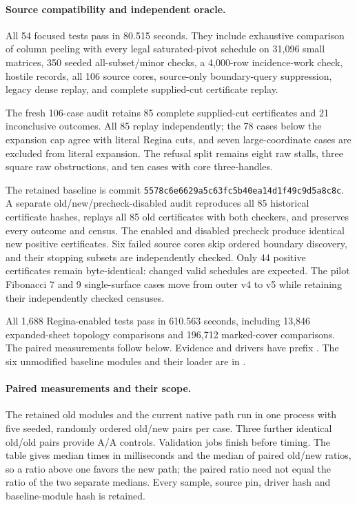 \paragraph{Source compatibility and independent oracle.}
All 54 focused tests pass in 80.515 seconds. They include exhaustive comparison
of column peeling with every legal saturated-pivot schedule on 31,096 small
matrices, 350 seeded all-subset/minor checks, a 4,000-row incidence-work check,
hostile records, all 106 source cores, source-only boundary-query suppression,
legacy dense replay, and complete supplied-cut certificate replay.

The fresh 106-case audit retains 85 complete supplied-cut certificates and
21 inconclusive outcomes. All 85 replay independently; the 78 cases below
the expansion cap agree with literal Regina cuts, and seven large-coordinate
cases are excluded from literal expansion. The refusal split remains eight
raw stalls, three square raw obstructions, and ten cases with core three-handles.

The retained baseline is commit \texttt{5578c6e6629a5c63fc5b40ea14d1f49c9d5a8c8c}.
A separate old/new/precheck-disabled audit reproduces all 85 historical
certificate hashes, replays all 85 old certificates with both checkers, and
preserves every outcome and census. The enabled and disabled precheck produce
identical new positive certificates. Six failed source cores skip ordered
boundary discovery, and their stopping subsets are independently checked.
Only 44 positive certificates remain byte-identical: changed valid schedules
are expected. The pilot Fibonacci 7 and 9 single-surface cases move from outer
v4 to v5 while retaining their independently checked censuses.

All 1,688 Regina-enabled tests pass in 610.563 seconds, including 13,846
expanded-sheet topology comparisons and 196,712 marked-cover comparisons.
The paired measurements follow below. Evidence and drivers have prefix
. The six unmodified baseline modules and their
loader are in .


\paragraph{Paired measurements and their scope.}
The retained old modules and the current native path run in one process with
five seeded, randomly ordered old/new pairs per case. Three further identical
old/old pairs provide A/A controls. Validation jobs finish before timing.
The table gives median times in milliseconds and the median of paired
old/new ratios, so a ratio above one favors the new path; the paired ratio
need not equal the ratio of the two separate medians. Every sample, source
pin, driver hash and baseline-module hash is retained.

